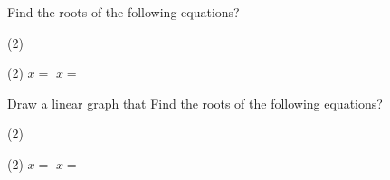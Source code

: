 
\begin{question}[ID=Math01,topic=math,difficulty=easy]
    Find the roots of the following equations? 
    \begin{tasks}(2)
        \task $ $
        \task $ $
    \end{tasks}
\end{question}
\begin{solution}
    \begin{tasks}(2)
        \task $x= $
        \task $x= $
    \end{tasks}
\end{solution}

\begin{question}[ID=Math01,topic=math,difficulty=easy]
    Draw a linear graph that 
    Find the roots of the following equations? 
    \begin{tasks}(2)
        \task $ $
        \task $ $
    \end{tasks}
\end{question}
\begin{solution}
    \begin{tasks}(2)
        \task $x= $
        \task $x= $
    \end{tasks}
\end{solution}

\endinput

